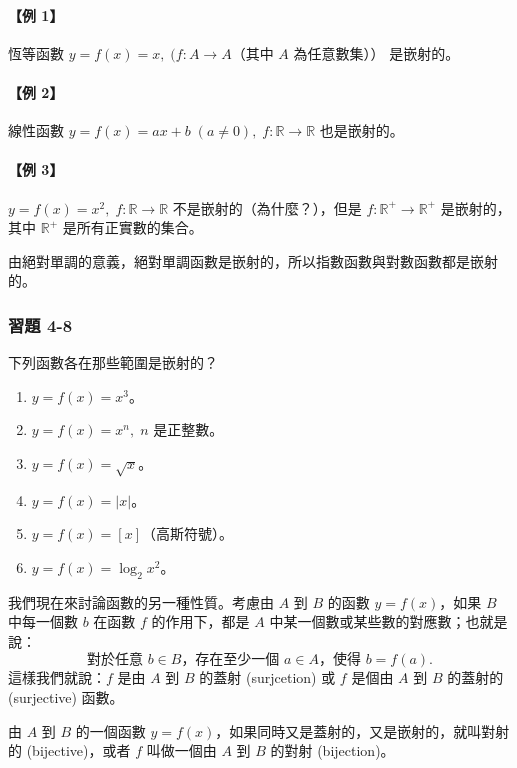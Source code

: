 \paragraph{【例 1】} 恆等函數 $y = f(x) = x,\; (f: A \to A \text{（其中 $A$ 為任意數集））}$ 是嵌射的。

\paragraph{【例 2】} 線性函數 $y = f(x) = ax+b\; (a\neq 0),\; f: \mathbb{R} \to \mathbb{R}$ 也是嵌射的。

\paragraph{【例 3】} $y = f(x) = x^2,\; f: \mathbb{R} \to \mathbb{R}$ 不是嵌射的（為什麼？），但是 $f: \mathbb{R}^+ \to \mathbb{R}^+$ 是嵌射的，其中 $\mathbb{R}^+$ 是所有正實數的集合。

由絕對單調的意義，絕對單調函數是嵌射的，所以指數函數與對數函數都是嵌射的。

\subsubsection*{習題 4-8}

下列函數各在那些範圍是嵌射的？
\begin{enumerate}
    \item $y = f(x) = x^3$。
    \item $y = f(x) = x^n,\; n$ 是正整數。
    \item $y = f(x) = \sqrt{x}$。
    \item $y = f(x) = |x|$。
    \item $y = f(x) = [x]$（高斯符號）。
    \item $y = f(x) = \log_2 x^2$。
\end{enumerate}

我們現在來討論函數的另一種性質。考慮由 $A$ 到 $B$ 的函數 $y = f(x)$，如果 $B$ 中每一個數 $b$ 在函數 $f$ 的作用下，都是 $A$ 中某一個數或某些數的對應數；也就是說：
\[
\text{對於任意 } b \in B\text{，存在至少一個 } a \in A\text{，使得 } b = f(a).
\]
這樣我們就說：$f$ 是由 $A$ 到 $B$ 的蓋射 (surjcetion)\label{note:b2-ch4-p106-surjcetion} 或 $f$ 是個由 $A$ 到 $B$ 的蓋射的 (surjective) 函數。

由 $A$ 到 $B$ 的一個函數 $y = f(x)$，如果同時又是蓋射的，又是嵌射的，就叫對射的 (bijective)，或者 $f$ 叫做一個由 $A$ 到 $B$ 的對射 (bijection)。

